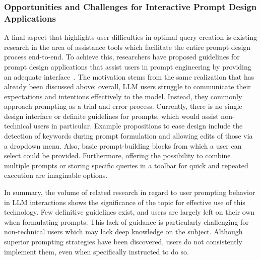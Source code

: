 \subsubsection{Opportunities and Challenges for Interactive Prompt Design Applications}
A final aspect that highlights user difficulties in optimal query creation is existing
research in the area of assistance tools which facilitate the entire prompt design process
end-to-end.
To achieve this, researchers have proposed guidelines for prompt design applications that assist
users in prompt engineering by providing an adequate interface~\cite{dang_how_2022}.
The motivation stems from the same realization that has already been discussed above: overall,
LLM users struggle to communicate their expectations and intentions effectively to the model.
Instead, they commonly approach prompting as a trial and error process.
Currently, there is no single design interface or definite guidelines for prompts, which would
assist non-technical users in particular.
Example propositions to ease design include the detection of keywords during prompt formulation and
allowing
edits of those via a dropdown menu.
Also, basic prompt-building blocks from which a user can
select could be provided.
Furthermore, offering the possibility to combine multiple prompts or storing specific queries
in a toolbar for quick and repeated execution are imaginable options.
\newline

In summary, the volume of related research in regard to user prompting behavior in LLM
interactions shows the significance of the topic for effective use of this technology.
Few definitive guidelines exist, and users are largely left on their own when formulating prompts.
This lack of guidance is particularly challenging for non-technical users which may lack deep
knowledge on the subject.
Although superior prompting strategies have been discovered, users do not consistently
implement them, even when specifically instructed to do so.

